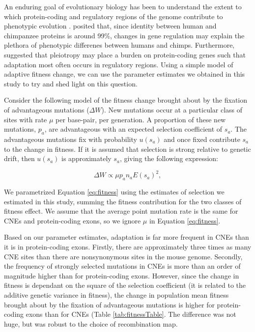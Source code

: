 \documentclass[11pt]{article}
\begin{document}
	An enduring goal of evolutionary biology has been to understand the extent to which protein-coding and regulatory regions of the genome contribute to phenotypic evolution \citep{RN347, RN346}. \cite{RN347} posited that, since identity between human and chimpanzee proteins is around 99\%, changes in gene regulation may explain the plethora of phenotypic differenes between humans and chimps. Furthermore, \cite{RN346} suggested that pleiotropy may place a burden on protein-coding genes such that adaptation most often occurs in regulatory regions. Using a simple model of adaptive fitness change, we can use the parameter estimates we obtained in this study to try and shed light on this question.

	Consider the following model of the fitness change brought about by the fixation of advantageous mutations ($\Delta W$). New mutations occur at a particular class of sites with rate $\mu$ per base-pair, per generation. A proportion of these new mutations, $p_a$, are advantageous with an expected selection coefficient of $s_a$. The advantageous mutations fix with probability $u(s_a)$ and once fixed contribute $s_a$ to the change in fitness. If it is assumed that selection is strong relative to genetic drift, then $u(s_a)$ is approximately $s_a$, giving the following expression:

\begin{equation}
\label{eq:fitness}
\Delta W \propto \mu p_a n_a E(s_a)^2,
\end{equation}

	We parametrized Equation \ref{eq:fitness} using the estimates of selection we estimated in this study, summing the fitness contribution for the two classes of fitness effect. We assume that the average point mutation rate is the same for CNEs and protein-coding exons, so we ignore $\mu$ in Equation \ref{eq:fitness}. 
 
	Based on our parameter estimates, adaptation is far more frequent in CNEs than it is in protein-coding exons. Firstly, there are approximately three times as many CNE sites than there are nonsynonymous sites in the mouse genome. Secondly, the frequency of strongly selected mutations in CNEs is more than an order of magnitude higher than for protein-coding exons. However, since the change in fitness is dependant on the square of the selection coefficient (it is related to the additive genetic variance in fitness), the change in population mean fitness brought about by the fixation of advantageous mutations is higher for protein-coding exons than for CNEs (Table \ref{tab:fitnessTable}. The difference was not huge, but was robust to the choice of recombination map.
	 
\end{document}
